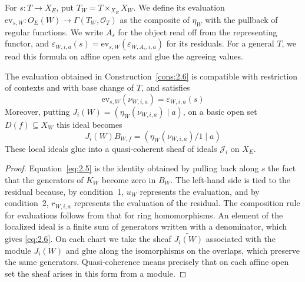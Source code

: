 \begin{construction}
For $s:T\to X_E$, put $T_W=T\times_{X_E}X_W$. We define its evaluation
$\mathrm{ev}_{s,W}:O_E(W)\to\Gamma(T_W,\mathcal{O}_T)$ as the composite of $\eta_W$ with
the pullback of regular functions. We write $A_s$ for the object read off from the
representing functor, and $\varepsilon_{W,i,a}(s)=\mathrm{ev}_{s,W}(\varepsilon_{W,A_s,i,a})$
for its residuals. For a general $T$, we read this formula on affine open sets and glue the
agreeing values.

\end{construction}

\begin{lemma}\label{lem:2.7}

The evaluation obtained in Construction~\ref{cons:2.6} is compatible with restriction of
contexts and with base change of $T$, and satisfies
\begin{equation*}
\mathrm{ev}_{s,W}(\nu_{W,i,a})=\varepsilon_{W,i,a}(s)
\tag{2.5}\label{eq:2.5}
\end{equation*}
Moreover, putting $J_i(W)=(\eta_W(\nu_{W,i,a})\mid a)$, on a basic open set
$D(f)\subseteq X_W$ this ideal becomes
\begin{equation*}
J_i(W)B_{W,f}
=(\eta_W(\nu_{W,i,a})/1\mid a)
\tag{2.6}\label{eq:2.6}
\end{equation*}
These local ideals glue into a quasi-coherent sheaf of ideals $\mathcal{J}_i$ on $X_E$.

\end{lemma}

\begin{proof}

Equation~\eqref{eq:2.5} is the identity obtained by pulling back along $s$ the fact that
the generators of $K_W$ become zero in $B_W$. The left-hand side is tied to the residual
because, by condition~1, $u_W$ represents the evaluation, and by condition~2, $r_{W,i,a}$
represents the evaluation of the residual. The composition rule for evaluations follows
from that for ring homomorphisms. An element of the localized ideal is a finite sum of
generators written with a denominator, which gives \eqref{eq:2.6}. On each chart we take
the sheaf $\widetilde{J_i(W)}$ associated with the module $J_i(W)$ and glue along the
isomorphisms on the overlaps, which preserve the same generators. Quasi-coherence means
precisely that on each affine open set the sheaf arises in this form from a module.

\end{proof}

